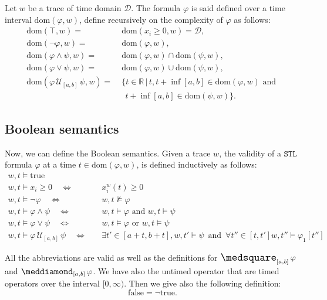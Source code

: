 \documentclass{suftesi}
\newcommand{\STL}{$\mathtt{STL}$ }
\newcommand{\dom}[1]{\mathrm{dom}(#1 ,w)}
\begin{document}
Let $w$ be a trace of time domain $\mathcal{D}$. The formula $\varphi$ is said defined over a time interval $\dom{\varphi}$, define recursively on the complexity of $\varphi$ as follows:
\begin{align*}
    \dom{\top}=                          &\;\dom{x_i\geq0}=\mathcal{D},\\
    \dom{\lnot\varphi}=                  &\;\dom{\varphi},\\
    \dom{\varphi\land\psi}=              &\;\dom{\varphi}\cap\dom{\psi},\\
    \dom{\varphi\lor\psi}=               &\;\dom{\varphi}\cup\dom{\psi},\\
    \dom{\varphi\,\mathcal{U}_{[a,b]}\,\psi}=  &\;\{t \in \mathbb{R} \,|\, t, t + \inf[a, b]\in \dom{\varphi}\text{ and } \\ & \;\;\,t + \inf[a, b] \in \dom{\psi}\}.
\end{align*}

\subsection{Boolean semantics}
Now, we can define the Boolean semantics. Given a trace $w$, the validity of a \STL formula $\varphi$ at a time $t\in\dom{\varphi}$, is defined inductively as follows:
\begin{align*}
    w,t\vDash \text{true} \quad\quad                                                  &\\
    w,t\vDash x_i\geq 0 \quad                               \Leftrightarrow    &\quad x_i^w(t)\geq 0\\
    w,t\vDash \lnot \varphi \quad                           \Leftrightarrow    &\quad w,t\nvDash \varphi \\
    w,t\vDash \varphi \land \psi \quad                      \Leftrightarrow    &\quad w,t\vDash \varphi \text{ and } w,t\vDash \psi\\
    w,t\vDash \varphi \lor \psi  \quad                      \Leftrightarrow    &\quad w,t\vDash \varphi \text{ or } w,t\vDash \psi\\
    w,t\vDash \varphi \, \mathcal{U}_{[a,b]} \, \psi \quad  \Leftrightarrow    &\quad \exists t'\in [a+t,b+t], w,t'\vDash\psi \,\text{ and }\, \forall t''\in[t,t']w,t''\vDash\varphi_1[t'']
\end{align*}

All the abbreviations are valid as well as the definitions for $\nec_{[a,b]}\varphi$ and $\pos_{[a,b]}\varphi$. We have also the untimed operator that are timed operators over the interval $[0,\infty)$. Then we give also the following definition: $$\text{false} = \lnot\text{true}.$$
\end{document}
